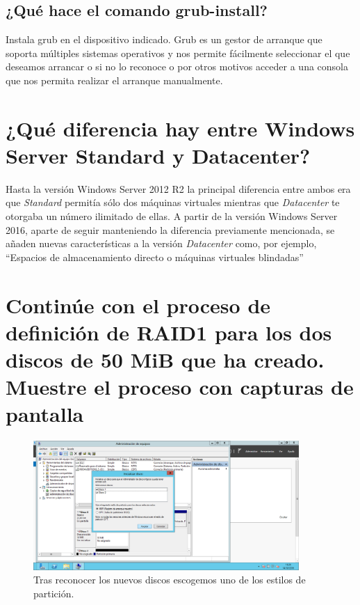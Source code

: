 {\subsection{¿Qué hace el comando grub-install?}
Instala grub en el dispositivo indicado.\cite{c11-1} Grub es un gestor de arranque que soporta múltiples sistemas operativos y nos permite fácilmente seleccionar el que deseamos arrancar o si no lo reconoce o por otros motivos acceder a una consola que nos permita realizar el arranque manualmente. \cite{c11-2}

\section{¿Qué diferencia hay entre Windows Server Standard y Datacenter?}
Hasta la versión Windows Server 2012 R2 la principal diferencia entre ambos era que \textit{Standard} permitía sólo dos máquinas virtuales mientras que \textit{Datacenter} te otorgaba un número ilimitado de ellas.\cite{c12-1}  A partir de la versión Windows Server 2016, aparte de seguir manteniendo la diferencia previamente mencionada, se añaden nuevas características a la versión \textit{Datacenter} como, por ejemplo, ``Espacios de almacenamiento directo o máquinas virtuales blindadas'' \cite{c12-2}
\section{Continúe con el proceso de definición de RAID1 para los dos discos de 50 MiB que ha creado. Muestre el proceso con capturas de pantalla}
\begin{figure}[H]
	\centering
	\includegraphics[width=0.9\textwidth]{raid1-1.png} 
	\caption{Tras reconocer los nuevos discos escogemos uno de los estilos de partición.}
\end{figure}

}
